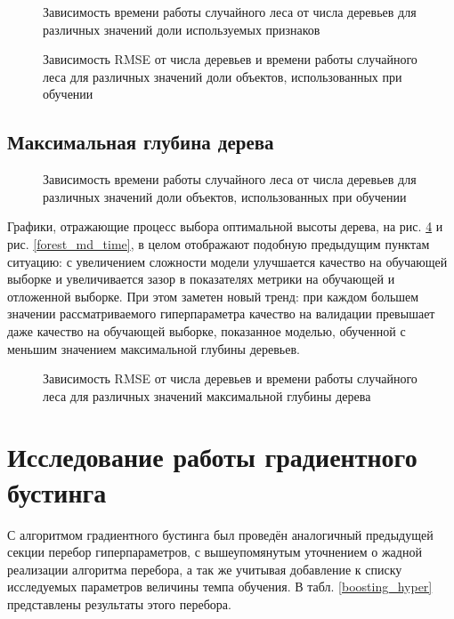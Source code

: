\documentclass[a4paper, 14pt]{article}
\begin{document}
    \begin{figure}[h]
      \centering
      
      \caption{Зависимость времени работы случайного леса от числа деревьев для различных значений доли используемых признаков}\label{forest_fss_time}
    \end{figure}

    \begin{figure}[h]
      \centering
      
      \caption{Зависимость RMSE от числа деревьев и времени работы случайного леса для различных значений доли объектов, использованных при обучении}\label{forest_ms}
    \end{figure}

\subsection{Максимальная глубина дерева}

    \begin{figure}[h]
      \centering
      
      \caption{Зависимость времени работы случайного леса от числа деревьев для различных значений доли объектов, использованных при обучении}\label{forest_ms_time}
    \end{figure}

    Графики, отражающие процесс выбора оптимальной высоты дерева, на рис. \ref{forest_md} и рис. \ref{forest_md_time}, в целом отображают подобную предыдущим пунктам ситуацию: с увеличением сложности модели улучшается качество на обучающей выборке и увеличивается зазор в показателях метрики на обучающей и отложенной выборке. При этом заметен новый тренд: при каждом большем значении рассматриваемого гиперпараметра качество на валидации превышает даже качество на обучающей выборке, показанное моделью, обученной с меньшим значением максимальной глубины деревьев.

    \begin{figure}[]
      \centering
      
      \caption{Зависимость RMSE от числа деревьев и времени работы случайного леса для различных значений максимальной глубины дерева}\label{forest_md}
    \end{figure}

\section{Исследование работы градиентного бустинга}
    С алгоритмом градиентного бустинга был проведён аналогичный предыдущей секции перебор гиперпараметров, с вышеупомянутым уточнением о жадной реализации алгоритма перебора, а так же учитывая добавление к списку исследуемых параметров величины темпа обучения. В табл. \ref{boosting_hyper} представлены результаты этого перебора.
\end{document}
